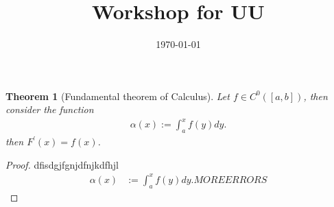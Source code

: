 \documentclass[reqno]{amsart}
\title{Workshop for UU}
\author{}
\date{\today}
\newtheorem{theorem}{Theorem}
\newcommand{\<}{\langle}
\renewcommand{\>}{\rangle}
\renewcommand{\>}{\rangle}
\begin{document}
\maketitle

\begin{theorem}[Fundamental theorem of Calculus]
  Let $f \in C^0([a,b])$, then consider the function
%
\begin{align*}
  \alpha(x):=
  \int_{a}^x f(y)  dy.
\end{align*}
% 
then $F^\prime(x)=f(x)$. 

\end{theorem}
\begin{proof}
dfisdgjfgnjdfnjkdfhjl
\begin{align*}
  \alpha(x)
&:=
  \int_{a}^x f(y)  dy.
  MORE ERRORS
\end{align*}

\end{proof}


%
%
\end{document}
